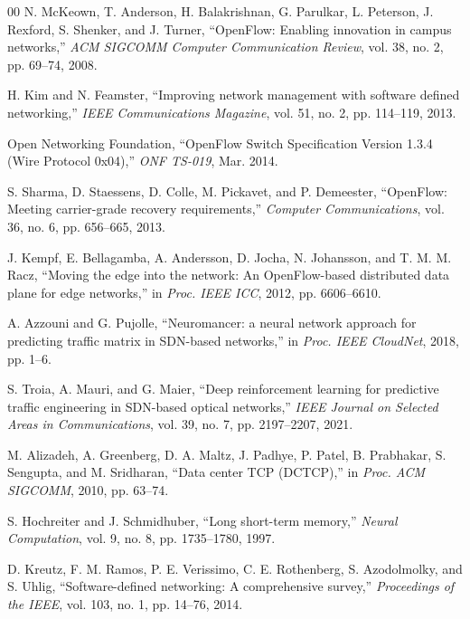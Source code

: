 \documentclass[conference]{IEEEtran}
\begin{document}
\begin{thebibliography}{00}
 N. McKeown, T. Anderson, H. Balakrishnan, G. Parulkar, L. Peterson, J. Rexford, S. Shenker, and J. Turner, ``OpenFlow: Enabling innovation in campus networks,'' \textit{ACM SIGCOMM Computer Communication Review}, vol. 38, no. 2, pp. 69--74, 2008.

 H. Kim and N. Feamster, ``Improving network management with software defined networking,'' \textit{IEEE Communications Magazine}, vol. 51, no. 2, pp. 114--119, 2013.

 Open Networking Foundation, ``OpenFlow Switch Specification Version 1.3.4 (Wire Protocol 0x04),'' \textit{ONF TS-019}, Mar. 2014.

 S. Sharma, D. Staessens, D. Colle, M. Pickavet, and P. Demeester, ``OpenFlow: Meeting carrier-grade recovery requirements,'' \textit{Computer Communications}, vol. 36, no. 6, pp. 656--665, 2013.

 J. Kempf, E. Bellagamba, A. Andersson, D. Jocha, N. Johansson, and T. M. M. Racz, ``Moving the edge into the network: An OpenFlow-based distributed data plane for edge networks,'' in \textit{Proc. IEEE ICC}, 2012, pp. 6606--6610.

 A. Azzouni and G. Pujolle, ``Neuromancer: a neural network approach for predicting traffic matrix in SDN-based networks,'' in \textit{Proc. IEEE CloudNet}, 2018, pp. 1--6.

 S. Troia, A. Mauri, and G. Maier, ``Deep reinforcement learning for predictive traffic engineering in SDN-based optical networks,'' \textit{IEEE Journal on Selected Areas in Communications}, vol. 39, no. 7, pp. 2197--2207, 2021.

 M. Alizadeh, A. Greenberg, D. A. Maltz, J. Padhye, P. Patel, B. Prabhakar, S. Sengupta, and M. Sridharan, ``Data center TCP (DCTCP),'' in \textit{Proc. ACM SIGCOMM}, 2010, pp. 63--74.

 S. Hochreiter and J. Schmidhuber, ``Long short-term memory,'' \textit{Neural Computation}, vol. 9, no. 8, pp. 1735--1780, 1997.

 D. Kreutz, F. M. Ramos, P. E. Verissimo, C. E. Rothenberg, S. Azodolmolky, and S. Uhlig, ``Software-defined networking: A comprehensive survey,'' \textit{Proceedings of the IEEE}, vol. 103, no. 1, pp. 14--76, 2014.


\end{thebibliography}
\end{document}
